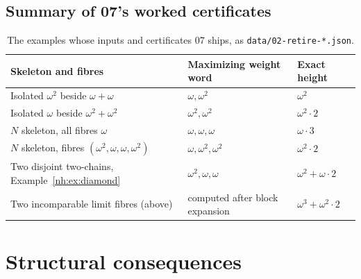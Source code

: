 \documentclass[11pt,a4paper]{article}
\theoremstyle{definition}
\theoremstyle{remark}
\begin{document}
\subsection{Summary of 07's worked certificates}

\begin{table}[htbp]
\centering\small
\begin{tabularx}{\textwidth}{@{}>{\raggedright\arraybackslash}p{}>{\raggedright\arraybackslash}p{}X@{}}
\toprule
Skeleton and fibres & Maximizing weight word & Exact height\\
\midrule
Isolated $\omega^2$ beside $\omega+\omega$ & $\omega,\omega^2$ & $\omega^2$\\
Isolated $\omega$ beside $\omega^2+\omega^2$ & $\omega^2,\omega^2$ & $\omega^2\cdot2$\\
$N$ skeleton, all fibres $\omega$ & $\omega,\omega,\omega$ & $\omega\cdot3$\\
$N$ skeleton, fibres $(\omega^2,\omega,\omega,\omega^2)$ & $\omega,\omega^2,\omega^2$ & $\omega^2\cdot2$\\
Two disjoint two-chains, Example~\ref{nh:ex:diamond} & $\omega^2,\omega,\omega$ & $\omega^2+\omega\cdot2$\\
Two incomparable limit fibres (above) & computed after block expansion & $\omega^3+\omega^2\cdot2$\\
\bottomrule
\end{tabularx}
\caption{The examples whose inputs and certificates 07 ships, as
\texttt{data/02-retire-*.json}.}
\label{nh:tab:retire}
\end{table}

\section{Structural consequences}\label{nh:sec:consequences}
\end{document}
